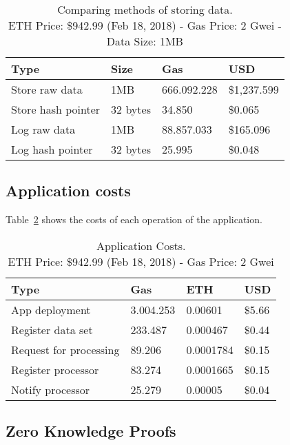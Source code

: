 \begin{table}[!htb]
  \centering
  \begin{tabular}{|l|l|l|l|}
    \hline
    Type & Size & Gas  & USD \\ \hline
    Store raw data & 1MB & 666.092.228  & \$1,237.599 \\ \hline
    Store hash pointer & 32 bytes & 34.850  & \$0.065 \\ \hline
    Log raw data & 1MB & 88.857.033  & \$165.096 \\ \hline
    Log hash pointer & 32 bytes & 25.995  & \$0.048 \\ \hline
  \end{tabular}
  \captionsetup{format=hang, justification=centering}
  \caption{Comparing methods of storing data.\\ ETH Price: \$942.99 (Feb 18, 2018) - Gas Price: 2 Gwei - Data Size: 1MB}
  \label{table:data_store_comparison_05}
\end{table}

\clearpage

\subsection{Application costs}
\label{evaluation:app_costs}

Table~\ref{table:app_costs} shows the costs of each operation of the application.

\begin{table}[!htb]
\centering
\begin{tabular}{|l|l|l|l|}
\hline
 Type & Gas & ETH & USD \\ \hline
 App deployment & 3.004.253 & 0.00601 & \$5.66 \\ \hline
 Register data set & 233.487 & 0.000467 & \$0.44 \\ \hline
 Request for processing & 89.206 & 0.0001784 & \$0.15 \\ \hline
 Register processor & 83.274 & 0.0001665 & \$0.15 \\ \hline
 Notify processor & 25.279 & 0.00005 & \$0.04 \\ \hline
\end{tabular}
\captionsetup{format=hang, justification=centering}
\caption{Application Costs.\\ ETH Price: \$942.99 (Feb 18, 2018) - Gas Price: 2 Gwei}
\label{table:app_costs}
\end{table}

\subsection{Zero Knowledge Proofs}
\label{evaluation:zkp}

